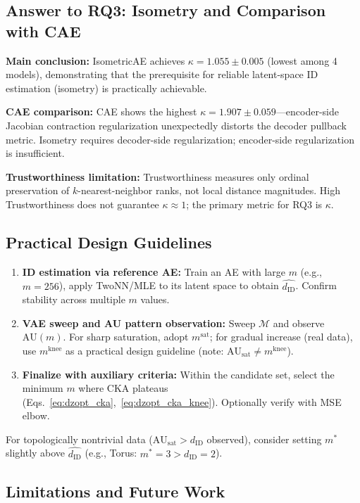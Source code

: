 \documentclass[lettersize,journal]{IEEEtran}
\newcommand{\dID}{d_{\mathrm{ID}}}
\newcommand{\kap}{\kappa}
\newcommand{\AUsat}{\mathrm{AU}_{\mathrm{sat}}}
\begin{document}
\subsection{Answer to RQ3: Isometry and Comparison with CAE}\label{sec:disc_rq3}

\textbf{Main conclusion:}
IsometricAE achieves $\kap = 1.055\pm0.005$ (lowest among 4 models), demonstrating that the prerequisite for reliable latent-space ID estimation (isometry) is practically achievable.

\textbf{CAE comparison:}
CAE shows the highest $\kap = 1.907\pm0.059$---encoder-side Jacobian contraction regularization unexpectedly distorts the decoder pullback metric.
Isometry requires decoder-side regularization; encoder-side regularization is insufficient.

\textbf{Trustworthiness limitation:}
Trustworthiness measures only ordinal preservation of $k$-nearest-neighbor ranks, not local distance magnitudes.
High Trustworthiness does not guarantee $\kap \approx 1$; the primary metric for RQ3 is $\kap$.

\subsection{Practical Design Guidelines}\label{sec:disc_guideline}

\begin{enumerate}
  \item \textbf{ID estimation via reference AE:} Train an AE with large $m$ (e.g., $m=256$), apply TwoNN/MLE to its latent space to obtain $\hat{\dID}$.
    Confirm stability across multiple $m$ values.
  \item \textbf{VAE sweep and AU pattern observation:} Sweep $\mathcal{M}$ and observe $\mathrm{AU}(m)$.
    For sharp saturation, adopt $m^\mathrm{sat}$; for gradual increase (real data), use $m^\mathrm{knee}$ as a practical design guideline (note: $\AUsat \neq m^\mathrm{knee}$).
  \item \textbf{Finalize with auxiliary criteria:} Within the candidate set, select the minimum $m$ where CKA plateaus (Eqs.~\eqref{eq:dzopt_cka},~\eqref{eq:dzopt_cka_knee}). Optionally verify with MSE elbow.
\end{enumerate}

For topologically nontrivial data ($\AUsat > \dID$ observed), consider setting $m^*$ slightly above $\hat{\dID}$ (e.g., Torus: $m^* = 3 > \dID = 2$).

\subsection{Limitations and Future Work}\label{sec:disc_limitation}
\end{document}

